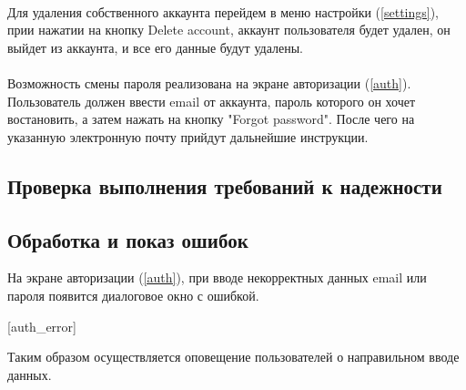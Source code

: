 \documentclass[testmethods]{espd}
\begin{document}
\paragraph{} %

Для удаления собственного аккаунта перейдем в меню настройки (\ref{settings}), прии нажатии на кнопку Delete account, аккаунт пользователя будет удален, он выйдет из аккаунта, и все его данные будут удалены.

\paragraph{} %

Возможность смены пароля реализована на экране авторизации (\ref{auth}).
Пользователь должен ввести email от аккаунта, пароль которого он хочет востановить, а затем нажать на кнопку "Forgot password". После чего на указанную электронную почту прийдут дальнейшие инструкции.

\subsection{Проверка выполнения требований к надежности}

\subsection{Обработка и показ ошибок}

На экране авторизации (\ref{auth}), при вводе некорректных данных email или пароля появится диалоговое окно с ошибкой. 

[auth_error]

Таким образом осуществляется оповещение пользователей о направильном вводе данных.  


\end{document}
